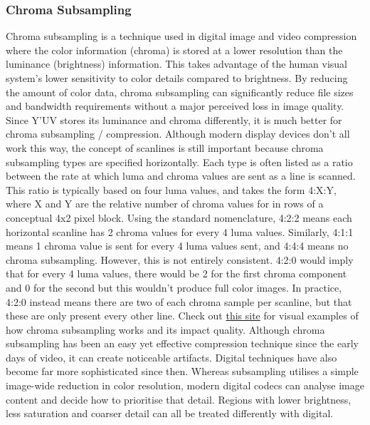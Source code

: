 \documentclass[10pt]{article}
\begin{document}
\begin{multicols}{2}
\subsubsection{Chroma Subsampling}
Chroma subsampling is a technique used in digital image and video compression where the color information (chroma) is stored at a lower resolution than the luminance (brightness) information.
This takes advantage of the human visual system's lower sensitivity to color details compared to brightness. By reducing the amount of color data, chroma subsampling can significantly reduce file sizes and bandwidth requirements without a major perceived loss in image quality.
Since Y'UV stores its luminance and chroma differently, it is much better for chroma subsampling / compression.
\newline \newline
Although modern display devices don't all work this way, the concept of scanlines is still important because chroma subsampling types are specified horizontally. Each type is often listed as a ratio between the rate at which luma and chroma values are sent as a line is scanned. This ratio is typically based on four luma values, and takes the form 4:X:Y, where X and Y are the relative number of chroma values for in rows of a conceptual 4x2 pixel block.
\newline \newline
Using the standard nomenclature, 4:2:2 means each horizontal scanline has 2 chroma values for every 4 luma values. Similarly, 4:1:1 means 1 chroma value is sent for every 4 luma values sent, and 4:4:4 means no chroma subsampling. However, this is not entirely consistent. 4:2:0 would imply that for every 4 luma values, there would be 2 for the first chroma component and 0 for the second but this wouldn't produce full color images. In practice, 4:2:0 instead means there are two of each chroma sample per scanline, but that these are only present every other line.
\newline \newline
Check out \href{https://www.red.com/red-101/video-chroma-subsampling#:~:text=Using%20the%20standard%20nomenclature%2C%204:2:2%20means%20each,subsampling.%20However%2C%20this%20is%20not%20entirely%20consistent.}{this site} for visual examples of how chroma subsampling works and its impact quality.
\newline \newline
Although chroma subsampling has been an easy yet effective compression technique since the early days of video, it can create noticeable artifacts. Digital techniques have also become far more sophisticated since then.
Whereas subsampling utilises a simple image-wide reduction in color resolution, modern digital codecs can analyse image content and decide how to prioritise that detail. Regions with lower brightness, less saturation and coarser detail can all be treated differently with digital.


\end{multicols}
\end{document}
